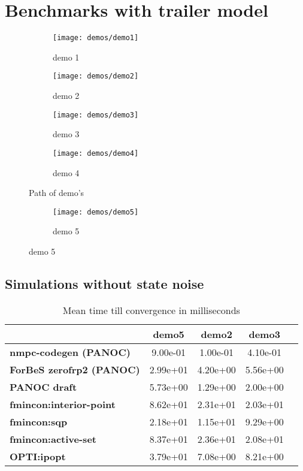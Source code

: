 		
\chapter{Benchmarks with trailer model}
\label{appendix:paths trailer simulations}

\begin{figure}[H]
	\centering
	\begin{subfigure}[b]{0.40\textwidth}
		\centering
		\texttt{[image: demos/demo1]}
		\caption{demo 1}
		\label{fig:demo 1}
	\end{subfigure}
	\hfill
	\begin{subfigure}[b]{0.40\textwidth}
		\centering
		\texttt{[image: demos/demo2]}
		\caption{demo 2}
		\label{fig:demo 2}
	\end{subfigure}
	\begin{subfigure}[b]{0.40\textwidth}
		\centering
		\texttt{[image: demos/demo3]}
		\caption{demo 3}
		\label{fig:demo 3}
	\end{subfigure}
	\hfill
	\begin{subfigure}[b]{0.40\textwidth}
		\centering
		\texttt{[image: demos/demo4]}
		\caption{demo 4}
		\label{fig:demo 4}
	\end{subfigure}
	\caption{Path of demo's}
	\label{fig:demos}
\end{figure}
\begin{figure}[H]
	\centering
	\begin{subfigure}[b]{0.45\textwidth}
		\centering
		\texttt{[image: demos/demo5]}
		\caption{demo 5}
		\label{fig:demo 5}
	\end{subfigure}
\end{figure}

\section{Simulations without state noise}
\label{appendix:benchmarks trailer without noise}

\begin{table}[H]
	\centering
	\begin{tabular}{|l|c|c|c|c|}
		\hline
		&\textbf{demo5}&\textbf{demo2}&\textbf{demo3}\\\hline
		\textbf{nmpc-codegen (PANOC)}&9.00e-01&1.00e-01&4.10e-01\\\hline
		\textbf{ForBeS zerofrp2 (PANOC)}&2.99e+01&4.20e+00&5.56e+00\\\hline
		\textbf{PANOC draft}&5.73e+00&1.29e+00&2.00e+00\\\hline
		\textbf{fmincon:interior-point}&8.62e+01&2.31e+01&2.03e+01\\\hline
		\textbf{fmincon:sqp}&2.18e+01&1.15e+01&9.29e+00\\\hline
		\textbf{fmincon:active-set}&8.37e+01&2.36e+01&2.08e+01\\\hline
		\textbf{OPTI:ipopt}&3.79e+01&7.08e+00&8.21e+00\\\hline
	\end{tabular}
	\caption{Mean time till convergence in milliseconds}
	\label{tbl:mean time till convergence}
\end{table}


